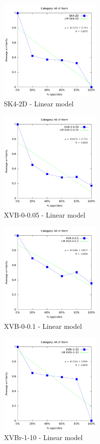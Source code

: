 \documentclass[a4paper,10pt]{article}
\begin{document}
\begin{figure}[ht]{\centering
\includegraphics[height=5cm]{allcat_SK4-2D_LM.pdf}
\caption{SK4-2D - Linear model}
}\end{figure}
\begin{figure}[ht]{\centering
\includegraphics[height=5cm]{allcat_XVB-0-0_05_LM.pdf}
\caption{XVB-0-0.05 - Linear model}
}\end{figure}
\begin{figure}[ht]{\centering
\includegraphics[height=5cm]{allcat_XVB-0-0_1_LM.pdf}
\caption{XVB-0-0.1 - Linear model}
}\end{figure}
\begin{figure}[ht]{\centering
\includegraphics[height=5cm]{allcat_XVBr-1-10_LM.pdf}
\caption{XVBr-1-10 - Linear model}
}\end{figure}
\end{document}
